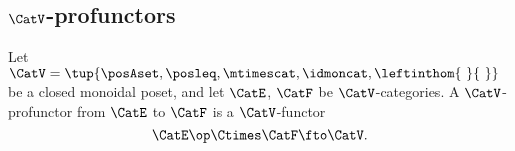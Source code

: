 \subsection{$\CatV$-profunctors}

\begin{ctdefinition}
\label{def:profunctor-monoidal-poset-enriched}
Let $\CatV = \tup{\posAset, \posleq, \mtimescat, \idmoncat, \leftinthom{\ }{\ }}$ be a closed monoidal poset, and let $\CatE$, $\CatF$ be $\CatV$-categories. A $\CatV$-profunctor from $\CatE$ to $\CatF$ is a $\CatV$-functor
\begin{equation}
\CatE\op \Ctimes \CatF \fto \CatV.
\end{equation}
\end{ctdefinition}


